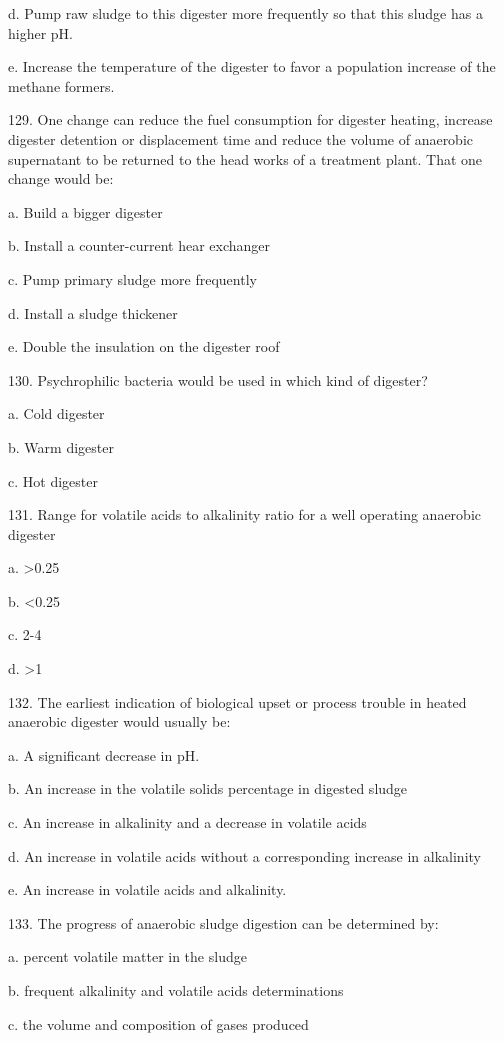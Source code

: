 \documentclass{article}
\begin{document}
d. Pump raw sludge to this digester more frequently so that this sludge has a higher pH. 

e. Increase the temperature of the digester to favor a population increase of the methane formers. 


129. One change can reduce the fuel consumption for digester heating, increase digester detention or displacement time and reduce the volume of anaerobic supernatant to be returned to the head works of a treatment plant. That one change would be: 

a. Build a bigger digester 

b. Install a counter-current hear exchanger 

c. Pump primary sludge more frequently 

d. Install a sludge thickener 

e. Double the insulation on the digester roof 


130. Psychrophilic bacteria would be used in which kind of digester? 

a. Cold digester 

b. Warm digester 

c. Hot digester 


131. Range for volatile acids to alkalinity ratio for a well operating anaerobic digester 

a. >0.25 

b. <0.25 

c. 2-4 

d. >1 


132. The earliest indication of biological upset or process trouble in heated anaerobic digester would usually be: 

a. A significant decrease in pH. 

b. An increase in the volatile solids percentage in digested sludge 

c. An increase in alkalinity and a decrease in volatile acids 

d. An increase in volatile acids without a corresponding increase in alkalinity 

e. An increase in volatile acids and alkalinity. 


133. The progress of anaerobic sludge digestion can be determined by: 

a. percent volatile matter in the sludge 

b. frequent alkalinity and volatile acids determinations 

c. the volume and composition of gases produced 
\end{document}
